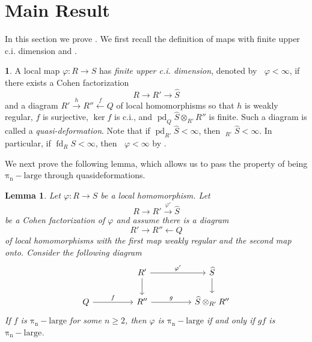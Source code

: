 \documentclass{amsart}
\newtheorem{lemma}[theorem]{Lemma}
\theoremstyle{definition}
\newtheorem{chunk}[theorem]{}
\DeclareMathOperator{\uppercidim}{CI^{*}dim}
\newcommand{\fdim}[2]{\operatorname{fd}_{#1}#2}
\newcommand{\pil}[1]{\operatorname{\pi_{#1}-large}}
\newcommand{\pdim}[2]{\operatorname{pd}_{#1}#2}
\begin{document}
\section{Main Result} \label{Section:UpperAQDim}
In this section we prove . We first recall the definition of maps with finite upper c.i. dimension \cite{Majadas:2016} and \cite{Takahashi:2004}.
\begin{chunk} \label{uppercidimension} A local map $\varphi\colon R\rightarrow S$ has \textit{finite upper c.i. dimension}, denoted by $\uppercidim{\varphi}<\infty$, if there exists a Cohen factorization
\[R\rightarrow R'\rightarrow \widehat{S}\]
and a diagram $R'\xrightarrow{h} R''\xleftarrow{f} Q$ of local homomorphisms so that $h$ is weakly regular, $f$ is surjective, $\ker{f}$ is c.i., and $\pdim{Q}{\widehat{S}\otimes_{R'}R''}$ is finite. Such a diagram is called a \textit{quasi-deformation}.  Note that if $\pdim{R'}{\widehat{S}}<\infty$, then $\uppercidim_{R'}\widehat{S}<\infty$. In particular, if $\fdim{R}{S}<\infty$, then $\uppercidim{\varphi}<\infty$ by \cite[Lemma 3.2]{Avramov/Foxby/Herzog:1994}.
\end{chunk}



We next prove the following lemma, which allows us to pass the property of being $\pil{n}$ through quasideformations.

\begin{lemma} \label{L_LongLemma} Let $\varphi\colon R\rightarrow S$ be a local homomorphism. Let
\[R\rightarrow R'\xrightarrow{\varphi'} \widehat{S}\]
be a Cohen factorization of $\varphi$ and assume there is a diagram
\[R'\rightarrow R''\leftarrow Q\]
of local homomorphisms with the first map weakly regular and the second map onto. Consider the following diagram
\[\begin{tikzcd}
	&& {R'} && {\widehat{S}} \\
	Q && {R''} && {\widehat{S}\otimes_{R'}R''}
	\arrow["{\varphi'}", from=1-3, to=1-5]
	\arrow[from=1-3, to=2-3]
	\arrow[from=1-5, to=2-5]
	\arrow["f", from=2-1, to=2-3]
	\arrow["g", from=2-3, to=2-5]
\end{tikzcd}\]
If $f$ is $\pil{n}$ for some $n \geq 2$, then $\varphi$ is $\pil{n}$ if and only if $gf$ is $\pil{n}$.
\end{lemma}
\end{document}
